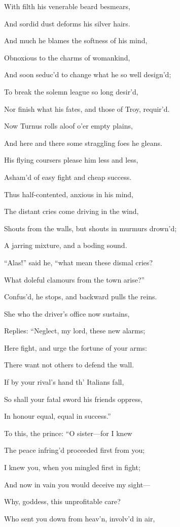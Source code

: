 With filth his venerable beard besmears,

And sordid dust deforms his silver hairs.

And much he blames the softness of his mind,

Obnoxious to the charms of womankind,

And soon seduc’d to change what he so well design’d;

To break the solemn league so long desir’d,

Nor finish what his fates, and those of Troy, requir’d.

Now Turnus rolls aloof o’er empty plains,

And here and there some straggling foes he gleans.

His flying coursers please him less and less,

Asham’d of easy fight and cheap success.

Thus half-contented, anxious in his mind,

The distant cries come driving in the wind,

Shouts from the walls, but shouts in murmurs drown’d;

A jarring mixture, and a boding sound.

“Alas!” said he, “what mean these dismal cries?

What doleful clamours from the town arise?”

Confus’d, he stops, and backward pulls the reins.

She who the driver’s office now sustains,

Replies: “Neglect, my lord, these new alarms;

Here fight, and urge the fortune of your arms:

There want not others to defend the wall.

If by your rival’s hand th’ Italians fall,

So shall your fatal sword his friends oppress,

In honour equal, equal in success.”

To this, the prince: “O sister—for I knew

The peace infring’d proceeded first from you;

I knew you, when you mingled first in fight;

And now in vain you would deceive my sight—

Why, goddess, this unprofitable care?

Who sent you down from heav’n, involv’d in air,

